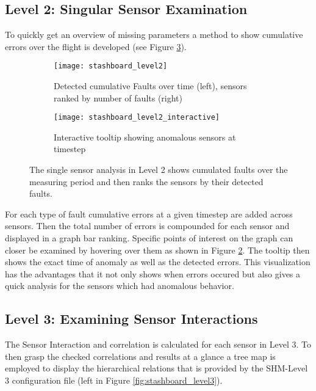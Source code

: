 \subsection{Level 2: Singular Sensor Examination}
To quickly get an overview of missing parameters a method to show cumulative errors over the flight is developed (see Figure \ref{fig:stashboard_level2}).
\begin{figure}[!h]
    \centering
    \begin{subfigure}[b]{1\textwidth}
        \centering
        \texttt{[image: stashboard\_level2]}
        \caption{Detected cumulative Faults over time (left), sensors ranked by number of faults (right)}
        \label{fig:stashboard_level2_clean}
    \end{subfigure}
    \begin{subfigure}[b]{1\textwidth}
        \centering
        \texttt{[image: stashboard\_level2\_interactive]}
        \caption{Interactive tooltip showing anomalous sensors at timestep}
        \label{fig:stashboard_level2_interactive}
    \end{subfigure}
    \caption[Stashboard: Level 2 display plotting $n_{errors}$ over the recording time and a total $n_{errors}$ ranking.]{The single sensor analysis in Level 2 shows cumulated faults over the measuring period and then ranks the sensors by their detected faults.}
    \label{fig:stashboard_level2}
\end{figure}

For each type of fault cumulative errors at a given timestep are added across sensors. Then the total number of errors is compounded for each sensor and displayed in a graph bar ranking. Specific points of interest on the graph can closer be examined by hovering over them as shown in Figure \ref{fig:stashboard_level2_interactive}. The tooltip then shows the exact time of anomaly as well as the detected errors. This visualization has the advantages that it not only shows when errors occured but also gives a quick analysis for the sensors which had anomalous behavior.

\subsection{Level 3: Examining Sensor Interactions}
The Sensor Interaction and correlation is calculated for each sensor in Level 3. To then grasp the checked correlations and results at a glance a tree map is employed to display the hierarchical relations that is provided by the SHM-Level 3 configuration file (left in Figure \ref{fig:stashboard_level3}).

